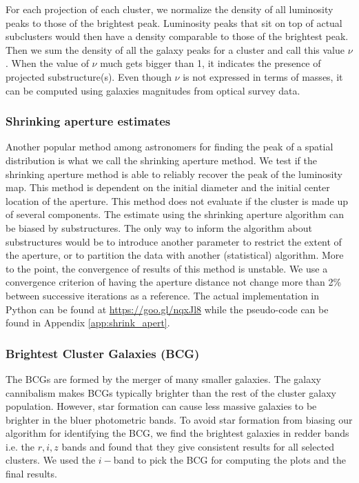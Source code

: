 For each projection of each cluster, we normalize the density of all 
luminosity peaks to those of the brightest peak. 
Luminosity peaks that sit on top of actual subclusters would then have a density 
comparable to those of the brightest peak. 
Then we sum the density of all the galaxy peaks for a cluster and call this value
$\nu$. When the value of $\nu$ much gets bigger than 1, it indicates the presence 
of projected substructure(s). Even though 
$\nu$ is not expressed in terms of masses, it can be computed using galaxies
magnitudes from optical survey data. 

\subsubsection{Shrinking aperture estimates}

Another popular method among astronomers for finding the peak of a spatial
distribution is what we call the shrinking aperture method.
We test if the shrinking aperture method is able to reliably recover the 
peak of the luminosity map.
This method is dependent on the initial diameter and the initial center 
location of the aperture.
This method does not evaluate if the cluster is made up of
several components.
The estimate using the shrinking aperture algorithm can be biased by
substructures. The only way to inform the algorithm about substructures would
be to introduce another parameter to restrict the extent of the aperture, or to
partition the data with another (statistical) algorithm.
More to the point, the convergence of results of this method is unstable. We use a
convergence criterion of having the aperture distance not change more than 2\% 
between successive iterations as a reference. The actual implementation in
{\sc Python} can be found at \href{https://goo.gl/nqxJl8}{https://goo.gl/nqxJl8} while
the pseudo-code can be found in Appendix \ref{app:shrink_apert}.

\subsubsection{Brightest Cluster Galaxies (BCG)}
The BCGs are formed by the merger of many smaller
galaxies. The galaxy cannibalism makes BCGs typically brighter than the rest of 
the cluster galaxy population. 
However, star formation can cause
less massive galaxies to be brighter in the bluer photometric bands.
To avoid star formation from biasing our algorithm for identifying the
BCG, we find the brightest galaxies in redder bands i.e. the $r, i, z$
bands and found that they give consistent results for all selected clusters. 
We used the $i-$band to pick the BCG for computing the plots and the final results. 
 
